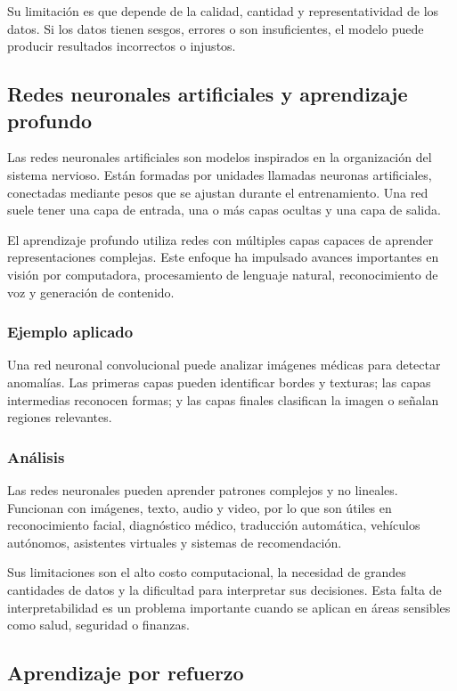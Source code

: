 Su limitación es que depende de la calidad, cantidad y representatividad de los datos. Si los datos tienen sesgos, errores o son insuficientes, el modelo puede producir resultados incorrectos o injustos.

\subsection{Redes neuronales artificiales y aprendizaje profundo}

Las redes neuronales artificiales son modelos inspirados en la organización del sistema nervioso. Están formadas por unidades llamadas neuronas artificiales, conectadas mediante pesos que se ajustan durante el entrenamiento. Una red suele tener una capa de entrada, una o más capas ocultas y una capa de salida.

El aprendizaje profundo utiliza redes con múltiples capas capaces de aprender representaciones complejas. Este enfoque ha impulsado avances importantes en visión por computadora, procesamiento de lenguaje natural, reconocimiento de voz y generación de contenido.

\subsubsection{Ejemplo aplicado}

Una red neuronal convolucional puede analizar imágenes médicas para detectar anomalías. Las primeras capas pueden identificar bordes y texturas; las capas intermedias reconocen formas; y las capas finales clasifican la imagen o señalan regiones relevantes.

\subsubsection{Análisis}

Las redes neuronales pueden aprender patrones complejos y no lineales. Funcionan con imágenes, texto, audio y video, por lo que son útiles en reconocimiento facial, diagnóstico médico, traducción automática, vehículos autónomos, asistentes virtuales y sistemas de recomendación.

Sus limitaciones son el alto costo computacional, la necesidad de grandes cantidades de datos y la dificultad para interpretar sus decisiones. Esta falta de interpretabilidad es un problema importante cuando se aplican en áreas sensibles como salud, seguridad o finanzas.

\subsection{Aprendizaje por refuerzo}

